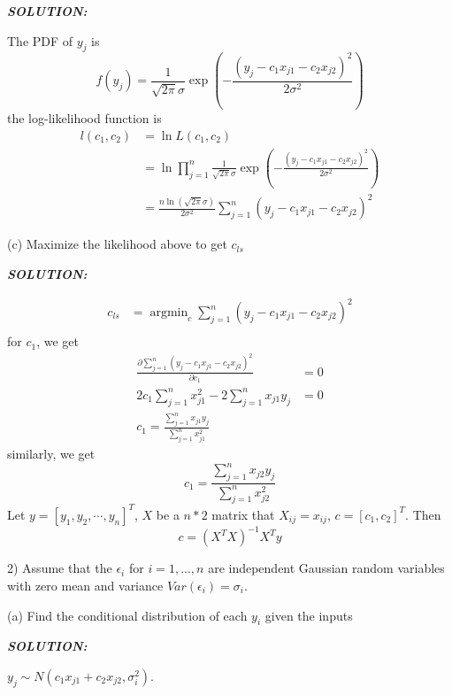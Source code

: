 \documentclass{article}
\DeclareMathOperator*{\argmin}{argmin}
\theoremstyle{definition}
\theoremstyle{definition}
\theoremstyle{remark}
\begin{document}
\qquad \emph{\textbf{SOLUTION:}}

\qquad\qquad The PDF of $y_j$ is \[f(y_j)= \frac{1}{\sqrt{2\pi}\sigma}\exp\left(-\frac{(y_j-c_1x_{j1}-c_2x_{j2})^2}{2\sigma^2}\right)\]
\qquad\qquad the log-likelihood function is
\begin{equation}\nonumber
\begin{aligned}
l(c_1,c_2) &= \ln L(c_1,c_2)\\
           &= \ln \prod_{j=1}^{n} \frac{1}{\sqrt{2\pi}\sigma}\exp\left(-\frac{(y_j-c_1x_{j1}-c_2x_{j2})^2}{2\sigma^2}\right)\\
           &= \frac{n\ln(\sqrt{2\pi}\sigma)}{2\sigma^2}\sum_{j=1}^{n}(y_j-c_1x_{j1}-c_2x_{j2})^2
\end{aligned}
\end{equation}

\qquad (c) Maximize the likelihood above to get $c_{ls}$

\qquad \emph{\textbf{SOLUTION:}}

\begin{equation}\nonumber
\begin{aligned}
c_{ls} &= \mathop{\argmin}_{c}\sum_{j=1}^{n}(y_j-c_1x_{j1}-c_2x_{j2})^2 \\
\end{aligned}
\end{equation}
\qquad for $c_1$, we get
\begin{equation}\nonumber
\begin{aligned}
\frac{\partial\sum_{j=1}^{n}(y_j-c_1x_{j1}-c_2x_{j2})^2}{\partial c_1} &= 0\\
2c_1\sum_{j=1}^{n} x_{j1}^2 - 2\sum_{j=1}^{n}x_{j1}y_j &= 0\\
c_1 = \frac{\sum_{j=1}^{n}x_{j1}y_j}{\sum_{j=1}^{n} x_{j1}^2}
\end{aligned}
\end{equation}
\qquad similarly, we get
\[c_1 = \frac{\sum_{j=1}^{n}x_{j2}y_j}{\sum_{j=1}^{n} x_{j2}^2}\]
\qquad Let $y = [y_1, y_2,\cdots,y_n]^T$, $X$ be a $n*2$ matrix that $X_{ij}=x_{ij}$, $c=[c_1,c_2]^T$. Then
\[c = (X^TX)^{-1}X^Ty\]

2) Assume that the $\epsilon _i$ for $i=1,...,n$ are independent Gaussian random variables with zero mean and variance $Var(\epsilon _i)=\sigma _i$.

\qquad (a) Find the conditional distribution of each $y_i$ given the inputs

\qquad \emph{\textbf{SOLUTION:}}

\qquad\qquad $y_j\sim N(c_1x_{j1}+c_2x_{j2},\sigma_i^2)$.
\end{document}

